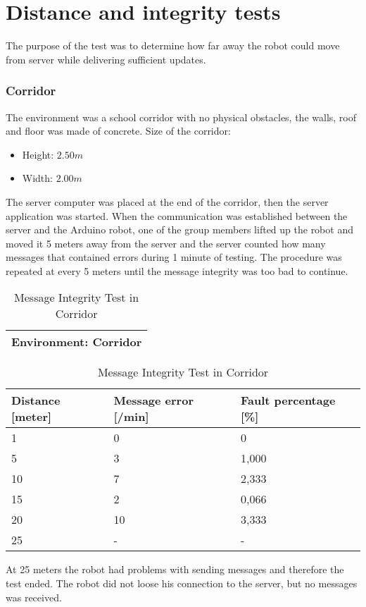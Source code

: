 \newpage
\section{Distance and integrity tests}
\label{sec:testcom}
The purpose of the test was to determine how far away the robot could move from server while delivering sufficient updates.
\subsubsection{Corridor}
The environment was a school corridor with no physical obstacles, the walls, roof and floor was made of concrete. Size of the corridor:
\begin{itemize}
    \item Height: $2.50 m$
    \item Width: $2.00 m$
\end{itemize}
The server computer was placed at the end of the corridor, then the server application was started. When the communication was established between the server and the Arduino robot, one of the group members lifted up the robot and moved it 5 meters away from the server and the server counted how many messages that contained errors during 1 minute of testing. The procedure was repeated at every 5 meters until the message integrity was too bad to continue.

\begin{table}[ht]
\begin{center}
 \begin{tabular}{|l|} 
 \hline
 Environment: \textbf{Corridor}\\
 \hline
 \end{tabular}
 \begin{tabular}{|l|l|l|}
 \hline
 Distance [meter] & Message error [/min] &  Fault percentage [\%]\\
 \hline
 1		        &   0 		&	0    \\
 5              &   3  		&	1,000\\
 10             &   7  		&	2,333\\
 15				&	2 		&	0,066\\
 20				&	10 		&	3,333\\
 25				&	-		&	-    \\
 \hline
\end{tabular}
\end{center}
\caption{Message Integrity Test in Corridor}
\label{tab:messintegritycorr}
\end{table}
At 25 meters the robot had problems with sending messages and therefore the test ended. The robot did not loose his connection to the server, but no messages was received. {\color{blue}{The conclusion is that a robot should never be further apart than 20 meters from the server dongle.}}

